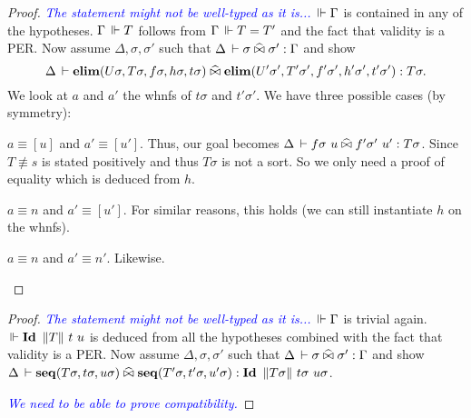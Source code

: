 \documentclass[a4paper,english]{lipics-utf8x}
\newcommand\meta[1]{\noindent\textcolor{blue}{\emph{#1}}}
\begin{document}
  \begin{proof}
    \meta{The statement might not be well-typed as it is...}
    $\,\Vdash \Gamma$ is contained in any of the hypotheses.
    $\Gamma \,\Vdash T$ follows from $\Gamma \,\Vdash T = T'$ and the fact that validity
    is a PER.
    Now assume $\Delta, \sigma, \sigma'$ such that
    $\Delta \,\vdash \sigma \mathrel{\widehat{\bowtie}} \sigma' : \Gamma$ and
    show
    \[\Delta \,\vdash \operatorname{\mathbf{elim}}(U \sigma,T \sigma,f \sigma,h \sigma,t \sigma) \mathrel{\widehat{\bowtie}}
    \operatorname{\mathbf{elim}}(U' \sigma',T' \sigma',f' \sigma',h' \sigma',t' \sigma') : T \sigma.\]
    We look at $a$ and $a'$ the whnfs of $t \sigma$ and $t' \sigma'$.
    We have three possible cases (by symmetry):
    \begin{caselist}
      \nextcase $a \equiv [u]$ and $a' \equiv [u']$.
      Thus, our goal becomes
      $\Delta \der f \sigma\ u \hEr f' \sigma'\ u' : T \sigma$.
      Since $T \nequiv s$ is stated positively and thus $T \sigma$ is not a
      sort. So we only need a proof of equality which is deduced from $h$.

      \nextcase $a \equiv n$ and $a' \equiv [u']$.
      For similar reasons, this holds (we can still instantiate $h$ on the
      whnfs).

      \nextcase $a \equiv n$ and $a' \equiv n'$.
      Likewise.
    \end{caselist}
  \end{proof}

  \begin{lemma}
    \leavevmode
    \begin{mathc}
    \end{mathc}
  \end{lemma}

  \begin{proof}
    \meta{The statement might not be well-typed as it is...}
    $\,\Vdash \Gamma$ is trivial again.
    $\,\Vdash \operatorname{\mathbf{Id}~} \|T\|\ t\ u$ is deduced from all the hypotheses combined
    with the fact that validity is a PER.
    Now assume $\Delta, \sigma, \sigma'$ such that
    $\Delta \,\vdash \sigma \mathrel{\widehat{\bowtie}} \sigma' : \Gamma$ and
    show
    $\Delta \der \seq(T\sigma,t\sigma,u\sigma) \hEr
    \seq(T'\sigma,t'\sigma,u'\sigma) : \Id \squash{T\sigma}\ t\sigma\ u\sigma$.

    \meta{We need to be able to prove compatibility.}
  \end{proof}
\end{document}
